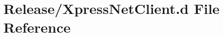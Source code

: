 \hypertarget{Release_2XpressNetClient_8d}{}\section{Release/\+Xpress\+Net\+Client.d File Reference}
\label{Release_2XpressNetClient_8d}

